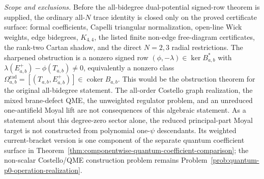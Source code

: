 \begin{stmt}
  \emph{Scope and exclusions.} Before the all-bidegree
  dual-potential signed-row theorem is supplied, the ordinary all-\(N\)
  trace identity is closed only on the proved certificate surface: formal coefficients,
  Capelli triangular normalization, open-line Wick weights, edge bidegrees,
  \(K_{4,4}\), the listed finite non-edge free-diagram certificates, the
  rank-two Cartan shadow, and the direct \(N=2,3\) radial restrictions.
  The sharpened obstruction is a nonzero signed row
  \((\phi,-\lambda)\in\ker B_{a,b}^*\) with
  \(\lambda(E^+_{a,b})-\phi(T_{a,b})\ne0\), equivalently a nonzero
  class
  \(\Omega^{\mathrm{rad}}_{a,b}
  =[(T_{a,b},E^+_{a,b})]\in\operatorname{coker}B_{a,b}\).  This would be
  the obstruction theorem for the
  original all-bidegree statement.  The all-order Costello graph
  realization, the mixed brane-defect QME, the unweighted regulator
  problem, and an unreduced one-antifield Moyal lift are not consequences
  of this algebraic statement.
  As a statement about this degree-zero sector alone, the reduced
  principal-part Moyal target is not constructed from polynomial
  one-\(\psi\) descendants.  Its weighted current-bracket version is one
  component of the separate quantum coefficient surface in
  Theorem~\ref{thm:componentwise-quantum-coefficient-comparison}; the non-scalar
  Costello/QME construction problem remains
  Problem~\ref{prob:quantum-p0-operation-realization}.
\end{stmt}

